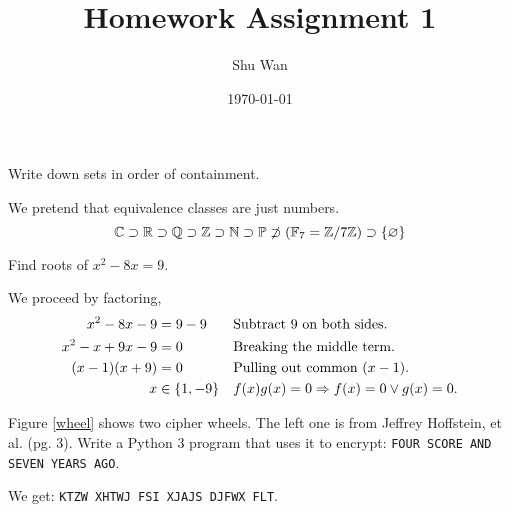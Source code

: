 \documentclass{homework}
\author{Shu Wan}
\date{\today}
\title{Homework Assignment 1}
\begin{document}
 \maketitle

\question Write down sets in order of containment.

We pretend that equivalence classes are just numbers.
\[
	\C \supset \R \supset \Q \supset \Z \supset \N \supset
	\P \not\supset (\GF[7] = \modulo[7])  \supset \{\nil\}
\]

\question Find roots of $x^2- 8x = 9$.

We proceed by factoring,
\begin{align*}
	x^2- 8x - 9     & = 9-9         &  & \text{Subtract 9 on both sides.}         \\
	x^2- x + 9x - 9 & = 0           &  & \text{Breaking the middle term.}         \\
	(x - 1)(x + 9)  & = 0           &  & \text{Pulling out common } (x - 1).      \\
	x               & \in \{1, -9\} &  & f(x)g(x) = 0 \Ra f(x) = 0 \vee g(x) = 0. \\
\end{align*}


\question Figure \ref{wheel} shows two cipher wheels. The left one is from Jeffrey Hoffstein, et al. \cite{hoffstein2008introduction} (pg. 3). Write a Python 3 program that uses it to encrypt: \texttt{FOUR SCORE AND SEVEN YEARS AGO}.



We get: \texttt{KTZW XHTWJ FSI XJAJS DJFWX FLT}.



\end{document}
